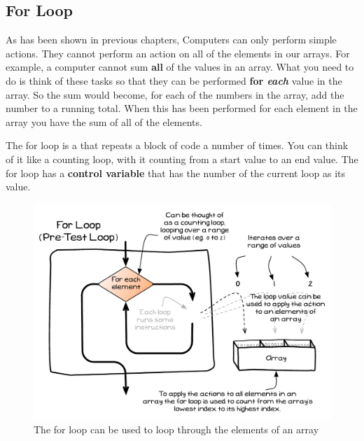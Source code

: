 \clearpage
\subsection{For Loop} %
\label{sub:for_loop}

As has been shown in previous chapters, Computers can only perform simple actions. They cannot perform an action on all of the elements in our arrays. For example, a computer cannot sum \textbf{all} of the values in an array. What you need to do is think of these tasks so that they can be performed \textbf{for \emph{each}} value in the array. So the sum would become, for each of the numbers in the array, add the number to a running total. When this has been performed for each element in the array you have the sum of all of the elements.

The for loop is a  that repeats a block of code a number of times. You can think of it like a counting loop, with it counting from a start value to an end value. The for loop has a \textbf{control variable} that has the number of the current loop as its value.

\begin{figure}[h]
   \centering
   \includegraphics[width=\textwidth]{./topics/arrays/diagrams/For} 
   \caption{The for loop can be used to loop through the elements of an array}
   \label{fig:for-loop}
\end{figure}

